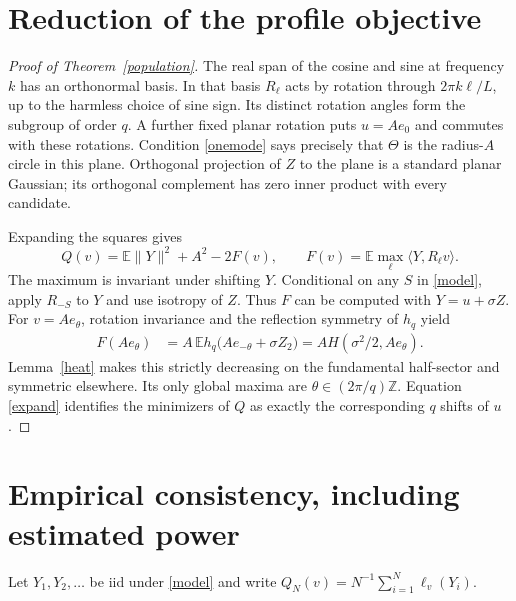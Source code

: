 \documentclass[11pt]{article}
\newcommand{\E}{\mathbb E}
\begin{document}
\section{Reduction of the profile objective}
\begin{proof}[Proof of Theorem~\ref{population}]
The real span of the cosine and sine at frequency $k$ has an
orthonormal basis. In that basis $R_\ell$ acts by rotation through
$2\pi k\ell/L$, up to the harmless choice of sine sign. Its distinct
rotation angles form the subgroup of order $q$. A further fixed planar
rotation puts $u=Ae_0$ and commutes with these rotations.
Condition \eqref{onemode} says precisely that $\Theta$ is the radius-$A$
circle in this plane. Orthogonal projection of $Z$ to the plane is a
standard planar Gaussian; its orthogonal complement has zero inner
product with every candidate.

Expanding the squares gives
\begin{equation}\label{expand}
 Q(v)=\E\|Y\|^2+A^2-2F(v),\qquad
 F(v)=\E\max_\ell\langle Y,R_\ell v\rangle.
\end{equation}
The maximum is invariant under shifting $Y$. Conditional on any $S$
in \eqref{model}, apply $R_{-S}$ to $Y$ and use isotropy of $Z$.
Thus $F$ can be computed with $Y=u+\sigma Z$. For $v=Ae_\theta$,
rotation invariance and the reflection symmetry of $h_q$ yield
\begin{align}
 F(Ae_\theta)
 &=A\,\E h_q\bigl(Ae_{-\theta}+\sigma Z_2\bigr)
   =A H(\sigma^2/2,Ae_\theta).\label{reduce}
\end{align}
Lemma~\ref{heat} makes this strictly decreasing on the fundamental
half-sector and symmetric elsewhere. Its only global maxima are
$\theta\in(2\pi/q)\mathbb Z$. Equation \eqref{expand} identifies
the minimizers of $Q$ as exactly the corresponding $q$ shifts of $u$.
\end{proof}

\section{Empirical consistency, including estimated power}
Let $Y_1,Y_2,\ldots$ be iid under \eqref{model} and write
$Q_N(v)=N^{-1}\sum_{i=1}^N\ell_v(Y_i)$.
\end{document}
